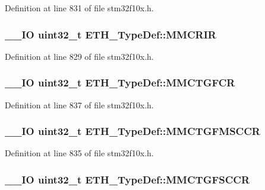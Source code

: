 Definition at line 831 of file stm32f10x.\-h.

\hypertarget{struct_e_t_h___type_def_a336820119836db549e754619be7f6aa5}{
\subsubsection[{M\-M\-C\-R\-I\-R}]{\setlength{\rightskip}{0pt plus 5cm}\-\_\-\-\_\-\-I\-O {\bf uint32\-\_\-t} E\-T\-H\-\_\-\-Type\-Def\-::\-M\-M\-C\-R\-I\-R}}\label{struct_e_t_h___type_def_a336820119836db549e754619be7f6aa5}


Definition at line 829 of file stm32f10x.\-h.

\hypertarget{struct_e_t_h___type_def_a0e2a79b3b31db0f07e269db092a74f1e}{
\subsubsection[{M\-M\-C\-T\-G\-F\-C\-R}]{\setlength{\rightskip}{0pt plus 5cm}\-\_\-\-\_\-\-I\-O {\bf uint32\-\_\-t} E\-T\-H\-\_\-\-Type\-Def\-::\-M\-M\-C\-T\-G\-F\-C\-R}}\label{struct_e_t_h___type_def_a0e2a79b3b31db0f07e269db092a74f1e}


Definition at line 837 of file stm32f10x.\-h.

\hypertarget{struct_e_t_h___type_def_acec318669d03f140af4a760093411150}{
\subsubsection[{M\-M\-C\-T\-G\-F\-M\-S\-C\-C\-R}]{\setlength{\rightskip}{0pt plus 5cm}\-\_\-\-\_\-\-I\-O {\bf uint32\-\_\-t} E\-T\-H\-\_\-\-Type\-Def\-::\-M\-M\-C\-T\-G\-F\-M\-S\-C\-C\-R}}\label{struct_e_t_h___type_def_acec318669d03f140af4a760093411150}


Definition at line 835 of file stm32f10x.\-h.

\hypertarget{struct_e_t_h___type_def_a1b55806b0e28cc18316cb1b9350aab2c}{
\subsubsection[{M\-M\-C\-T\-G\-F\-S\-C\-C\-R}]{\setlength{\rightskip}{0pt plus 5cm}\-\_\-\-\_\-\-I\-O {\bf uint32\-\_\-t} E\-T\-H\-\_\-\-Type\-Def\-::\-M\-M\-C\-T\-G\-F\-S\-C\-C\-R}}\label{struct_e_t_h___type_def_a1b55806b0e28cc18316cb1b9350aab2c}



